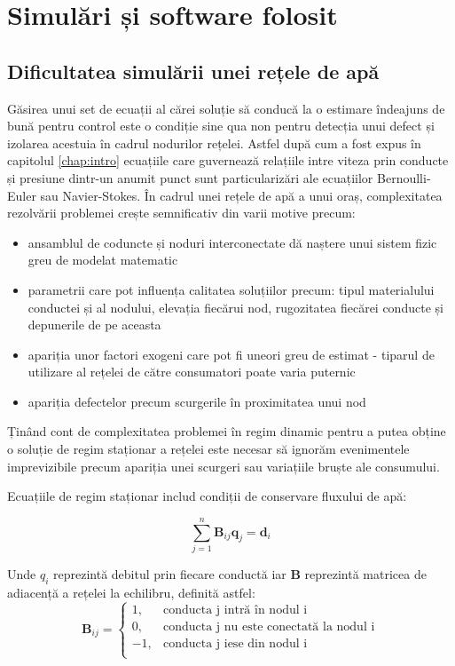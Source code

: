 \chapter{Simulări și software folosit}
\label{chap:simulari}

\section{Dificultatea simulării unei rețele de apă}

Găsirea unui set de ecuații al cărei soluție să conducă la o estimare îndeajuns de bună pentru control este o condiție sine qua non pentru detecția unui defect și izolarea acestuia în cadrul nodurilor rețelei. Astfel după cum a fost expus în capitolul \ref{chap:intro} ecuațiile care guvernează relațiile intre viteza prin conducte și presiune dintr-un anumit punct sunt particularizări ale ecuațiilor Bernoulli-Euler sau Navier-Stokes. În cadrul unei rețele de apă a unui oraș, complexitatea rezolvării problemei crește semnificativ din varii motive precum:
\begin{itemize}
\item ansamblul de coduncte și noduri interconectate dă naștere unui sistem fizic greu de modelat matematic
\item parametrii care pot influența calitatea soluțiilor precum: tipul materialului conductei și al nodului, elevația fiecărui nod, rugozitatea fiecărei conducte și depunerile de pe aceasta
\item apariția unor factori exogeni care pot fi uneori greu de estimat - tiparul de utilizare al rețelei de către consumatori poate varia puternic
\item apariția defectelor precum scurgerile în proximitatea unui nod
\end{itemize}

Ținând cont de complexitatea problemei în regim dinamic pentru a putea obține o soluție de regim staționar a rețelei este necesar să ignorăm evenimentele imprevizibile precum apariția unei scurgeri sau variațiile bruște ale consumului.

Ecuațiile de regim staționar includ condiții de conservare fluxului de apă:

\begin{equation}
\label{Ecuația de conservare a rețelei de apă}
\sum\limits_{j=1}^{n} \mathbf B_{ij}\mathbf q_j=\mathbf d_i
\end{equation}

Unde $q_i$ reprezintă debitul prin fiecare conductă iar \textbf{B} reprezintă matricea de adiacență a rețelei la echilibru, definită astfel:
\begin{equation}
\textbf{B}_{ij} = 
     \begin{cases}
       1, & \text{conducta j intră în nodul i}\\
       0, & \text{conducta j nu este conectată la nodul i} \\
       -1, & \text{conducta j iese din nodul i}\\ 
     \end{cases}
\end{equation}

